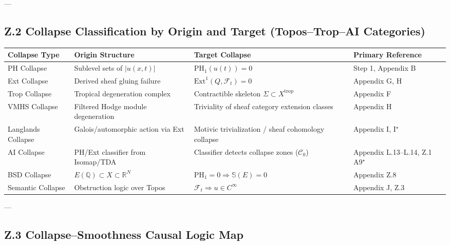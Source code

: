 \documentclass[11pt]{article}
\newcommand{\Sha}{\mathbb{S}}
\begin{document}
\begin{axiom}
\begin{axiom}
{{---

\subsection*{Z.2 Collapse Classification by Origin and Target (Topos–Trop–AI Categories)}

\begin{tabular}{>{\raggedright\arraybackslash}p{3.2cm} >{\raggedright\arraybackslash}p{4.0cm} >{\raggedright\arraybackslash}p{4.0cm} >{\raggedright\arraybackslash}p{2.5cm}}
\toprule
\textbf{Collapse Type} & \textbf{Origin Structure} & \textbf{Target Collapse} & \textbf{Primary Reference} \\
\midrule
PH Collapse & Sublevel sets of \( |u(x,t)| \) & \( \mathrm{PH}_1(u(t)) = 0 \) & Step 1, Appendix B \\
Ext Collapse & Derived sheaf gluing failure & \( \mathrm{Ext}^1(Q, \mathcal{F}_t) = 0 \) & Appendix G, H \\
Trop Collapse & Tropical degeneration complex & Contractible skeleton \( \Sigma \subset X^{\text{trop}} \) & Appendix F \\
VMHS Collapse & Filtered Hodge module degeneration & Triviality of sheaf category extension classes & Appendix H \\
Langlands Collapse & Galois/automorphic action via Ext & Motivic trivialization / sheaf cohomology collapse & Appendix I, I⁺ \\
AI Collapse & PH/Ext classifier from Isomap/TDA & Classifier detects collapse zones (\( \mathcal{C}_0 \)) & Appendix L.13–L.14, Z.1 A9⁺ \\
BSD Collapse & \( E(\mathbb{Q}) \subset X \subset \mathbb{R}^N \) & \( \mathrm{PH}_1 = 0 \Rightarrow \Sha(E) = 0 \) & Appendix Z.8 \\
Semantic Collapse & Obstruction logic over Topos & \( \mathcal{F}_t \Rightarrow u \in C^\infty \) & Appendix J, Z.3 \\
\bottomrule
\end{tabular}


---

\subsection*{Z.3 Collapse–Smoothness Causal Logic Map}

\begin{center}
\end{center}

}}
\end{axiom}
\end{axiom}
\end{document}
